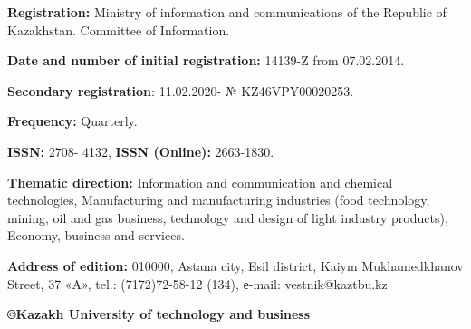 \textbf{Registration:} Ministry of information and communications of the
Republic of Kazakhstan. Committee of Information.

\textbf{Date and number of initial registration:} 14139-Z from
07.02.2014.

\textbf{Secondary registration}: 11.02.2020- № KZ46VPY00020253.

\textbf{Frequency:} Quarterly.

\textbf{ISSN:} 2708- 4132, \textbf{ISSN (Online):} 2663-1830.

\textbf{Thematic direction:} Information and communication and chemical
technologies, Manufacturing and manufacturing industries (food
technology, mining, oil and gas business, technology and design of light
industry products), Economy, business and services.

\textbf{Address of edition:} 010000, Astana city, Esil district, Kaiym
Mukhamedkhanov Street, 37 «A», tel.: (7172)72-58-12 (134),
е-mail: vestnik@kaztbu.kz

\begin{center}
\textbf{\large ©Kazakh University of technology and business}
\end{center}

\pagebreak
